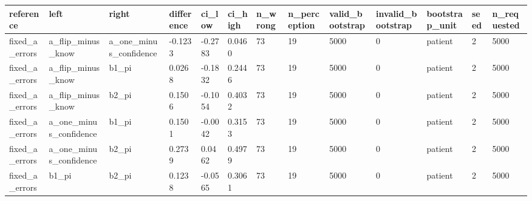 \begin{tabular}{lllllllllllll}
\hline
reference & left & right & difference & ci\_low & ci\_high & n\_wrong & n\_perception & valid\_bootstrap & invalid\_bootstrap & bootstrap\_unit & seed & n\_requested \\
\hline
fixed\_a\_errors & a\_flip\_minus\_know & a\_one\_minus\_confidence & -0.1233 & -0.2783 & 0.0460 & 73 & 19 & 5000 & 0 & patient & 2 & 5000 \\
fixed\_a\_errors & a\_flip\_minus\_know & b1\_pi & 0.0268 & -0.1832 & 0.2446 & 73 & 19 & 5000 & 0 & patient & 2 & 5000 \\
fixed\_a\_errors & a\_flip\_minus\_know & b2\_pi & 0.1506 & -0.1054 & 0.4032 & 73 & 19 & 5000 & 0 & patient & 2 & 5000 \\
fixed\_a\_errors & a\_one\_minus\_confidence & b1\_pi & 0.1501 & -0.0042 & 0.3153 & 73 & 19 & 5000 & 0 & patient & 2 & 5000 \\
fixed\_a\_errors & a\_one\_minus\_confidence & b2\_pi & 0.2739 & 0.0462 & 0.4979 & 73 & 19 & 5000 & 0 & patient & 2 & 5000 \\
fixed\_a\_errors & b1\_pi & b2\_pi & 0.1238 & -0.0565 & 0.3061 & 73 & 19 & 5000 & 0 & patient & 2 & 5000 \\
\hline
\end{tabular}
